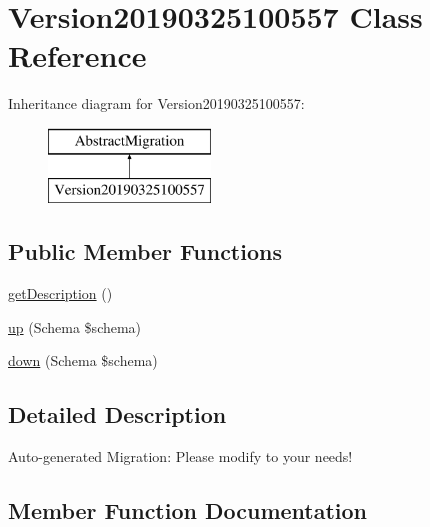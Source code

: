 \hypertarget{class_doctrine_migrations_1_1_version20190325100557}{}\section{Version20190325100557 Class Reference}
\label{class_doctrine_migrations_1_1_version20190325100557}
Inheritance diagram for Version20190325100557\+:\begin{figure}[H]
\begin{center}
\leavevmode
\includegraphics[height=2.000000cm]{class_doctrine_migrations_1_1_version20190325100557}
\end{center}
\end{figure}
\subsection*{Public Member Functions}
\begin{DoxyCompactItemize}
\item 
\mbox{\hyperlink{class_doctrine_migrations_1_1_version20190325100557_a2e7bb35c71bf1824456ceb944cb7a845}{get\+Description}} ()
\item 
\mbox{\hyperlink{class_doctrine_migrations_1_1_version20190325100557_a23eb1c1428e8ea2ab2cf798fc06ec421}{up}} (Schema \$schema)
\item 
\mbox{\hyperlink{class_doctrine_migrations_1_1_version20190325100557_aa8eb70255a46429d4d6165c778c9e5b9}{down}} (Schema \$schema)
\end{DoxyCompactItemize}


\subsection{Detailed Description}
Auto-\/generated Migration\+: Please modify to your needs! 

\subsection{Member Function Documentation}
\mbox{\label{class_doctrine_migrations_1_1_version20190325100557_aa8eb70255a46429d4d6165c778c9e5b9}} 
